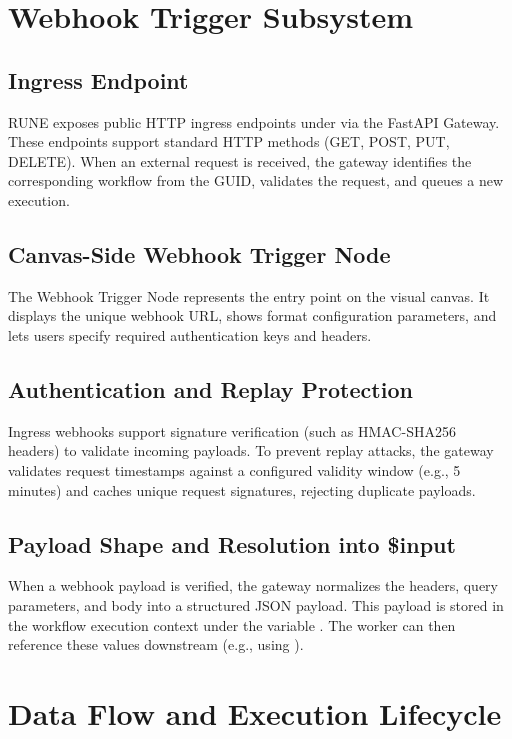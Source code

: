 \documentclass[12pt]{report}
\begin{document}
\chapter{Webhook Trigger Subsystem}
\label{ch:webhook_trigger}

\section{Ingress Endpoint}
RUNE exposes public HTTP ingress endpoints under  via the FastAPI Gateway. These endpoints support standard HTTP methods (GET, POST, PUT, DELETE). When an external request is received, the gateway identifies the corresponding workflow from the GUID, validates the request, and queues a new execution.

\section{Canvas-Side Webhook Trigger Node}
The Webhook Trigger Node represents the entry point on the visual canvas. It displays the unique webhook URL, shows format configuration parameters, and lets users specify required authentication keys and headers.

\section{Authentication and Replay Protection}
Ingress webhooks support signature verification (such as HMAC-SHA256 headers) to validate incoming payloads. To prevent replay attacks, the gateway validates request timestamps against a configured validity window (e.g., 5 minutes) and caches unique request signatures, rejecting duplicate payloads.

\section{Payload Shape and Resolution into \$input}
When a webhook payload is verified, the gateway normalizes the headers, query parameters, and body into a structured JSON payload. This payload is stored in the workflow execution context under the variable . The worker can then reference these values downstream (e.g., using ).

\chapter{Data Flow and Execution Lifecycle}
\label{ch:data_flow_lifecycle}
\end{document}
